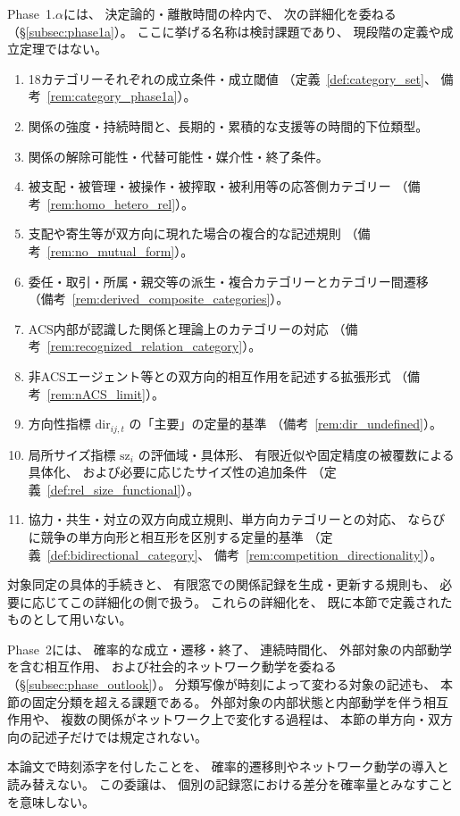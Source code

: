 \begin{remark}
\label{rem:phase1a_delegation}
Phase~1.$\alpha$には、
決定論的・離散時間の枠内で、
次の詳細化を委ねる（\S\ref{subsec:phase1a}）。
ここに挙げる名称は検討課題であり、
現段階の定義や成立定理ではない。
\begin{enumerate}
 \item 18カテゴリーそれぞれの成立条件・成立閾値
 （定義~\ref{def:category_set}、
備考~\ref{rem:category_phase1a}）。
 \item 関係の強度・持続時間と、長期的・累積的な支援等の時間的下位類型。
 \item 関係の解除可能性・代替可能性・媒介性・終了条件。
 \item 被支配・被管理・被操作・被搾取・被利用等の応答側カテゴリー
 （備考~\ref{rem:homo_hetero_rel}）。
 \item 支配や寄生等が双方向に現れた場合の複合的な記述規則
 （備考~\ref{rem:no_mutual_form}）。
 \item 委任・取引・所属・親交等の派生・複合カテゴリーとカテゴリー間遷移
 （備考~\ref{rem:derived_composite_categories}）。
 \item ACS内部が認識した関係と理論上のカテゴリーの対応
 （備考~\ref{rem:recognized_relation_category}）。
 \item 非ACSエージェント等との双方向的相互作用を記述する拡張形式
 （備考~\ref{rem:nACS_limit}）。
 \item 方向性指標 $\mathrm{dir}_{ij,t}$ の「主要」の定量的基準
 （備考~\ref{rem:dir_undefined}）。
 \item 局所サイズ指標 $\mathrm{sz}_i$ の評価域・具体形、
 有限近似や固定精度の被覆数による具体化、
および必要に応じたサイズ性の追加条件
 （定義~\ref{def:rel_size_functional}）。
 \item 協力・共生・対立の双方向成立規則、単方向カテゴリーとの対応、
 ならびに競争の単方向形と相互形を区別する定量的基準
 （定義~\ref{def:bidirectional_category}、
備考~\ref{rem:competition_directionality}）。
\end{enumerate}

対象同定の具体的手続きと、
有限窓での関係記録を生成・更新する規則も、
必要に応じてこの詳細化の側で扱う。
これらの詳細化を、
既に本節で定義されたものとして用いない。
\end{remark}

\begin{remark}
\label{rem:phase2_delegation}
Phase~2には、
確率的な成立・遷移・終了、
連続時間化、
外部対象の内部動学を含む相互作用、
および社会的ネットワーク動学を委ねる（\S\ref{subsec:phase_outlook}）。
分類写像が時刻によって変わる対象の記述も、
本節の固定分類を超える課題である。
外部対象の内部状態と内部動学を伴う相互作用や、
複数の関係がネットワーク上で変化する過程は、
本節の単方向・双方向の記述子だけでは規定されない。

本論文で時刻添字を付したことを、
確率的遷移則やネットワーク動学の導入と読み替えない。
この委譲は、
個別の記録窓における差分を確率量とみなすことを意味しない。
\end{remark}

